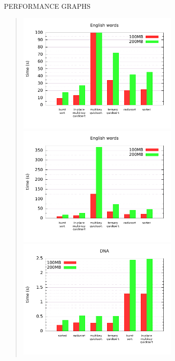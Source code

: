 {\sffamily\normalsize{\color{sciorange} PERFORMANCE GRAPHS}}\vspace{-3mm}\\
\footnotesize 
\begin{quote}
\includegraphics[width=80mm]{words-0-100.pdf}
\includegraphics[width=80mm]{words-0-400.pdf}\\
\includegraphics[width=80mm]{dna.pdf}
\end{quote}
